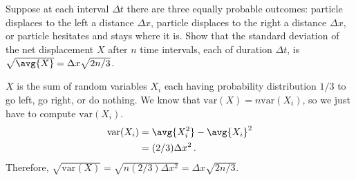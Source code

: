 

Suppose at each interval $\Delta t$ there are three equally probable outcomes:
particle displaces to the left a distance $\Delta x$,
particle displaces to the right a distance $\Delta x$,
or particle hesitates and stays where it is.
Show that the standard deviation of the net displacement $X$ after $n$ time intervals, each of duration $\Delta t$, is $\sqrt{\avg{X}} = \Delta x \sqrt{2n/3}$.


$X$ is the sum of random variables $X_i$ each having probability distribution $1/3$ to go left, go right, or do nothing.
We know that $\text{var}(X) = n \text{var}(X_i)$, so we just have to compute $\text{var}(X_i)$.
\begin{align*}
  \text{var}(X_i)
  &= \avg{X_i^2} - \avg{X_i}^2 \\
  &= (2/3)\Delta x^2 \, .
\end{align*}
Therefore, $\sqrt{\text{var}(X)} = \sqrt{n (2/3) \Delta x^2} = \Delta x \sqrt{2n/3}$.
